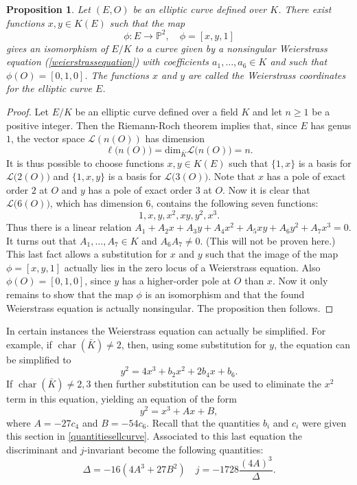 \documentclass{article}
\numberwithin{equation}{section}
\newtheorem{proposition}[theorem]{Proposition}
\theoremstyle{definition}
\newcommand{\Char}[1]{\operatorname{char} (#1)} %
\newcommand{\proj}[1]{{\mathbb P}^{#1}} %
\begin{document}
\begin{proposition}
Let $(E,O)$ be an elliptic curve defined over $K$. There exist functions $x,y \in K(E)$ such that the map $$\phi:E \rightarrow \proj{2},\quad \phi=[x,y,1]$$ gives an isomorphism of $E/K$ to a curve given by a nonsingular Weierstrass equation (\ref{weierstrassequation}) with coefficients $a_1,\ldots,a_6 \in K$ and such that $\phi(O)=[0,1,0]$. The functions $x$ and $y$ are called the Weierstrass coordinates for the elliptic curve $E$.
\end{proposition}

\begin{proof}
Let $E/K$ be an elliptic curve defined over a field $K$ and let $n \geq 1$ be a positive integer. Then the Riemann-Roch theorem implies that, since $E$ has genus $1$, the vector space $\mathcal{L}(n(O))$ has dimension $$\ell\big(n(O)\big)=\text{dim}_{\bar{K}}\mathcal{L}\big(n(O)\big)=n.$$ It is thus possible to choose functions $x,y \in K(E)$ such that $\{1,x\}$ is a basis for $\mathcal{L}\big(2(O)\big)$ and $\{1,x,y\}$ is a basis for $\mathcal{L}\big(3(O)\big)$. Note that $x$ has a pole of exact order $2$ at $O$ and $y$ has a pole of exact order $3$ at $O$. Now it is clear that $\mathcal{L}\big(6(O)\big)$, which has dimension $6$, contains the following seven functions: $$1,x,y,x^2,xy,y^2,x^3.$$ Thus there is a linear relation $A_1+A_2x+A_3y+A_4x^2+A_5xy+A_6y^2+A_7x^3=0$. It turns out that $A_1,\ldots,A_7 \in K$ and $A_6A_7 \neq 0$. (This will not be proven here.) This last fact allows a substitution for $x$ and $y$ such that the image of the map $\phi=[x,y,1]$ actually lies in the zero locus of a Weierstrass equation. Also $\phi(O)=[0,1,0]$, since $y$ has a higher-order pole at $O$ than $x$. Now it only remains to show that the map $\phi$ is an isomorphism and that the found Weierstrass equation is actually nonsingular. The proposition then follows. 
\end{proof}


In certain instances the Weierstrass equation can actually be simplified. For example, if $\Char{\bar{K}}\neq 2$, then, using some substitution for $y$, the equation can be simplified to $$y^2=4x^3+b_2x^2+2b_4x+b_6.$$ If $\Char{\bar{K}}\neq 2,3$ then further substitution can be used to eliminate the $x^2$ term in this equation, yielding an equation of the form \begin{equation}\label{weierstrasshighchar}y^2=x^3+Ax+B,\end{equation} where $A=-27c_4$ and $B = -54c_6$. Recall that the quantities $b_i$ and $c_i$ were given this section in \ref{quantitiesellcurve}. Associated to this last equation the discriminant and $j$-invariant become the following quantities: $$\Delta=-16(4A^3+27B^2) \quad j=-1728\frac{(4A)^3}{\Delta}.$$
\end{document}
